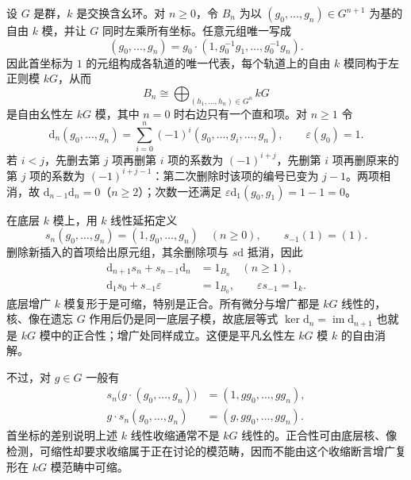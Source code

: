 \begin{example}\label{b4:exm:homogeneous-bar}
	设 \(G\) 是群，\(k\) 是交换含幺环。对 \(n\ge0\)，令 \(B_n\) 为以 \((g_0,\ldots,g_n)\in G^{n+1}\) 为基的自由 \(k\) 模，并让 \(G\) 同时左乘所有坐标。任意元组唯一写成
	\[
		(g_0,\ldots,g_n) =g_0\cdot(1,g_0^{-1}g_1,\ldots,g_0^{-1}g_n).
	\]
	因此首坐标为 \(1\) 的元组构成各轨道的唯一代表，每个轨道上的自由 \(k\) 模同构于左正则模 \(kG\)，从而
	\[
		B_n\cong\bigoplus_{(h_1,\ldots,h_n)\in G^n}kG
	\]
	是自由幺性左 \(kG\) 模，其中 \(n=0\) 时右边只有一个直和项。对 \(n\ge1\) 令
	\[
		\mathrm{d}_n(g_0,\ldots,g_n) =\sum_{i=0}^n(-1)^i(g_0,\ldots,\widehat{g_i},\ldots,g_n), \qquad\varepsilon(g_0)=1.
	\]
	若 \(i<j\)，先删去第 \(j\) 项再删第 \(i\) 项的系数为 \((-1)^{i+j}\)，先删第 \(i\) 项再删原来的第 \(j\) 项的系数为 \((-1)^{i+j-1}\)：第二次删除时该项的编号已变为 \(j-1\)。两项相消，故 \(\mathrm{d}_{n-1}\mathrm{d}_n=0\)（\(n\ge2\)）；次数一还满足 \(\varepsilon\mathrm{d}_1(g_0,g_1)=1-1=0\)。

	在底层 \(k\) 模上，用 \(k\) 线性延拓定义
	\[
		s_n(g_0,\ldots,g_n)=(1,g_0,\ldots,g_n)\quad(n\ge0), \qquad s_{-1}(1)=(1).
	\]
	删除新插入的首项给出原元组，其余删除项与 \(s\mathrm{d}\) 抵消，因此
	\[
		\begin{aligned}
			\mathrm{d}_{n+1}s_n+s_{n-1}\mathrm{d}_n&=1_{B_n}\quad(n\ge1),\\
			\mathrm{d}_1s_0+s_{-1}\varepsilon&=1_{B_0}, \qquad \varepsilon s_{-1}=1_k.
		\end{aligned}
	\]
	底层增广 \(k\) 模复形于是可缩，特别是正合。所有微分与增广都是 \(kG\) 线性的，核、像在遗忘 \(G\) 作用后仍是同一底层子模，故底层等式 \(\ker\mathrm{d}_n=\operatorname{im}\mathrm{d}_{n+1}\) 也就是 \(kG\) 模中的正合性；增广处同样成立。这便是平凡幺性左 \(kG\) 模 \(k\) 的自由消解。

	不过，对 \(g\in G\) 一般有
	\[
		\begin{aligned}
			s_n\bigl(g\cdot(g_0,\ldots,g_n)\bigr)&=(1,gg_0,\ldots,gg_n),\\
			g\cdot s_n(g_0,\ldots,g_n)&=(g,gg_0,\ldots,gg_n).
		\end{aligned}
	\]
	首坐标的差别说明上述 \(k\) 线性收缩通常不是 \(kG\) 线性的。正合性可由底层核、像检测，可缩性却要求收缩属于正在讨论的模范畴，因而不能由这个收缩断言增广复形在 \(kG\) 模范畴中可缩。
\end{example}

